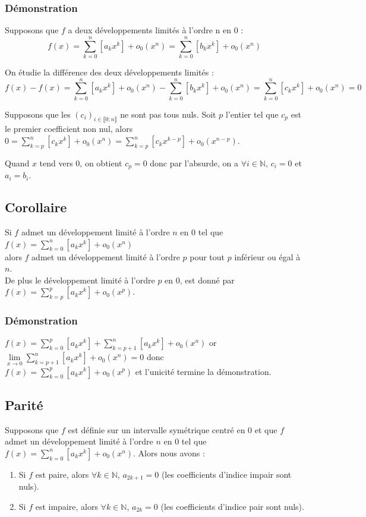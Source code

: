 \documentclass[a4paper,10pt]{book} %
\newcommand{\N}{\mathbb{N}}
\newcommand{\dl}{développement limité }
\newcommand{\dls}{développements limités }
\newcommand{\displayAmath}{\displaystyle}
\begin{document}
\subsubsection{Démonstration}
Supposons que $f$ a deux \dls à l'ordre n en 0 :
$$ f(x)=\sum\limits_{k=0}^{n}[a_kx^k]+o_0(x^n)=\sum\limits_{k=0}^{n}[b_kx^k]+o_0(x^n)$$

On étudie la différence des deux \dls : $$f(x)-f(x)= \sum\limits_{k=0}^{n}[a_kx^k]+o_0(x^n)-\sum\limits_{k=0}^{n}[b_kx^k]+o_0(x^n)=\sum\limits_{k=0}^{n}[c_kx^k]+o_0(x^n)=0$$

Supposons que les $(c_i)_{i\in\llbracket 0; n\rrbracket}$ ne sont pas tous nuls. Soit $p$ l'entier tel que $c_p$ est le premier coefficient non nul, alors  $\displaystyle0=\sum\limits_{k=p}^{n}[c_kx^k]+o_0(x^n) =\sum\limits_{k=p}^{n}[c_kx^{k-p}]+o_0(x^{n-p})$.

Quand $x$ tend vers 0, on obtient $c_p=0$ donc par l'absurde, on a $\forall i\in \N$, $c_i=0$ et $a_i=b_i$.

\subsection{Corollaire}
Si $f$ admet un \dl à l'ordre $n$ en 0 tel que $f(x)=\sum\limits_{k=0}^{n}[a_kx^{k}]+o_0(x^{n})$\\
alors $f$ admet un \dl à l'ordre $p$ pour tout $p$ inférieur ou égal à $n$.\\
De plus le \dl à l'ordre $p$ en 0, est donné par $\displaystyle f(x)=\sum\limits_{k=p}^{p}[a_kx^{k}]+o_0(x^p)$.

\subsubsection{Démonstration}
$\displaystyle f(x)=\sum\limits_{k=0}^{p}[a_kx^{k}]+\sum\limits_{k=p+1}^{n}[a_kx^{k}]+o_0(x^{n})$
or $\displayAmath\lim\limits_{x\rightarrow 0}\sum\limits_{k=p+1}^{n}[a_kx^{k}]+o_0(x^{n})=0$ donc\\
$\displaystyle f(x)=\sum_{k=0}^{p}[a_kx^{k}]+o_0(x^{p})$ et l'unicité termine la démonstration.

\subsection{Parité}
Supposons que $f$ est définie sur un intervalle symétrique centré en 0 et que $f$ admet un \dl à l'ordre $n$ en 0 tel que $\displaystyle f(x)=\sum\limits_{k=0}^{n}[a_kx^{k}]+o_0(x^{n})$. Alors nous avons :
\begin{enumerate}
\item Si $f$ est paire, alors $\forall k\in \N$, $a_{2k+1}=0$ (les coefficients d'indice impair sont nuls).
\item Si $f$ est impaire, alors $\forall k\in \N$, $a_{2k}=0$ (les coefficients d'indice pair sont nuls).
\end{enumerate}
\end{document}
